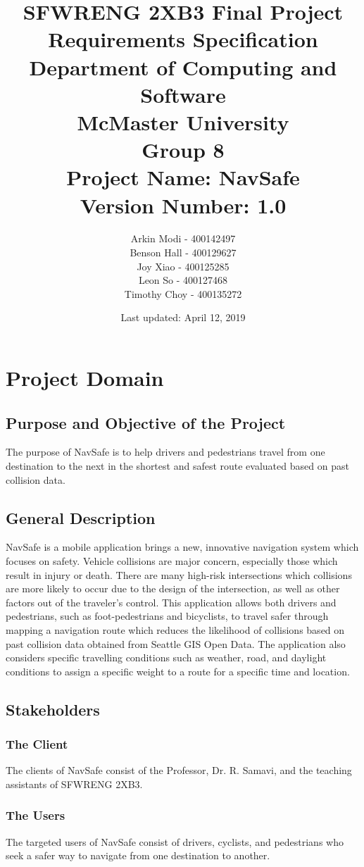 \documentclass[12pt]{article}
\title{
    SFWRENG 2XB3 Final Project \\
    \large Requirements Specification\\
    \vspace{1ex}
    \large Department of Computing and Software\\
    \large McMaster University\\
    \vspace{1ex}
    \large Group 8\\
    \large Project Name: NavSafe\\
    \large Version Number: 1.0
}
\author{
    Arkin Modi - 400142497\\
    Benson Hall - 400129627\\
    Joy Xiao - 400125285\\
    Leon So - 400127468\\
    Timothy Choy - 400135272
}
\date{Last updated: April 12, 2019}
\begin{document}
\maketitle
\newpage
\tableofcontents
\newpage

\section{Project Domain}
\subsection{Purpose and Objective of the Project}
The purpose of NavSafe is to help drivers and pedestrians travel from one destination to the next in the shortest and safest route evaluated based on past collision data. 

\subsection{General Description}
NavSafe is a mobile application brings a new, innovative navigation system which focuses on safety. Vehicle collisions are major concern, especially those which result in injury or death. There are many high-risk intersections which collisions are more likely to occur due to the design of the intersection, as well as other factors out of the traveler’s control. This application allows both drivers and pedestrians, such as foot-pedestrians and bicyclists, to travel safer through mapping a navigation route which reduces the likelihood of collisions based on past collision data obtained from Seattle GIS Open Data. The application also considers specific travelling conditions such as weather, road, and daylight conditions to assign a specific weight to a route for a specific time and location.

\subsection{Stakeholders}

    \subsubsection{The Client}
    The clients of NavSafe consist of the Professor, Dr. R. Samavi, and the teaching assistants of SFWRENG 2XB3.
    
    \subsubsection{The Users}
    The targeted users of NavSafe consist of drivers, cyclists, and pedestrians who seek a safer way to navigate from one destination to another.
    
\end{document}
